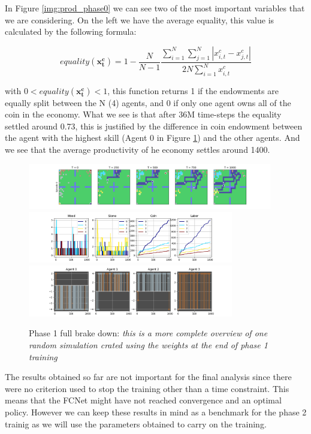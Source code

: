 In Figure \ref{img:prod_phase0} we can see two of the most important variables that we are considering. On the left we have the average equality, this value is calculated by the following formula:

\begin{equation}
    equality(\mathbf{x^c_{t}}) = 1 - \frac{N}{N-1} \frac{\sum^N_{i=1}\sum^N_{j=1}| x^c_{i,t} - x^c_{j,t}|}{2N\sum^N_{i=1}x^c_{i,t}}
\end{equation}

with \( 0 < equality(\mathbf{x^c_{t}}) < 1 \), this function returns 1 if the endowments are equally split between the N (4) agents, and 0 if only one agent owns all of the coin in the economy. What we see is that after 36M time-steps the equality settled around 0.73, this is justified by the difference in coin endowment between the agent with the highest skill (Agent 0 in Figure \ref{img:p0_brakedown}) and the other agents. And we see that the average productivity of he economy settles around 1400. 


\begin{figure}[h!]
    \centering
    \includegraphics[width=0.95\textwidth]{Resources/imgs/Figure_1.png}
    \includegraphics[width=0.80\textwidth]{Resources/imgs/Figure_2.png}
    \includegraphics[width=0.80\textwidth]{Resources/imgs/Figure_3.png}
    \caption[Phase 1 full brake down: ]%
    {\label{img:p0_brakedown}Phase 1 full brake down: \small \textit{this is a more complete overview of one random simulation crated using the weights at the end of phase 1 training}}
\end{figure}


The results obtained so far are not important for the final analysis since there were no criterion used to stop the training other than a time constraint. This means that the FCNet might have not reached convergence and an optimal policy. However we can keep these results in mind as a benchmark for the phase 2 trainig as we will use the parameters obtained to carry on the training.


